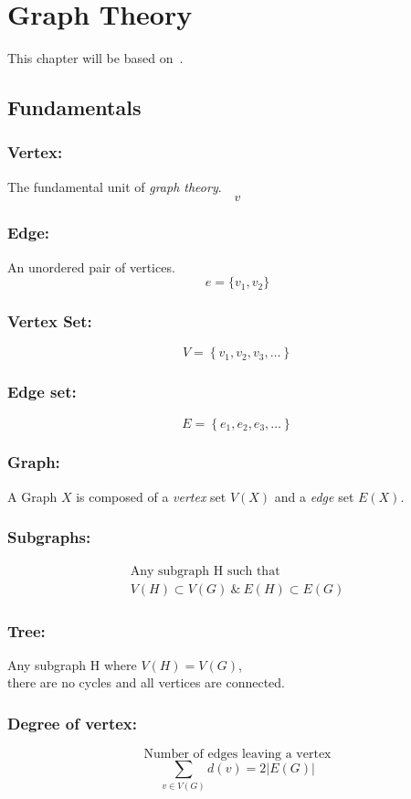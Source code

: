 \documentclass[../../mathematics_cheat_sheet.tex]{subfiles}
\begin{document}
\chapter{Graph Theory}
This chapter will be based on~\citet{GodsilRoyle2001}\cite{GodsilRoyle2001}.
\section{Fundamentals}
\subsection{Vertex:}
The fundamental unit of \emph{graph theory}.
\[v\]
\subsection{Edge:}
An unordered pair of vertices.
\[e=\{v_{1},v_{2}\}\]
\subsection{Vertex Set:}
\[
V=\left\{v_{1}, v_{2}, v_{3}, \ldots\right\}
\]
\subsection{Edge set:}
\[
E=\left\{e_{1}, e_{2}, e_{3}, \ldots\right\}
\]
\subsection{Graph:}
A Graph $X$ is composed of a \emph{vertex} set $V(X)$ and a \emph{edge} set $E(X)$.
\subsection{Subgraphs:}
\[
\begin{array}{cc}
\text{Any subgraph } \mathrm{H} \text{ such that}\\
V(H) \subset V(G) ~\&~ E(H) \subset E(G)
\end{array}
\]
\subsection{Tree:}
\begin{center}
Any subgraph $\mathrm{H}$ where $V(H)=V(G)$,\\ there are no cycles and all vertices are connected.
\end{center}
%
\subsection{Degree of vertex:}
\[\text{Number of edges leaving a vertex}\]
\[\sum_{v \in V(G)} d(v)=2|E(G)| \]
%
%
\end{document}
